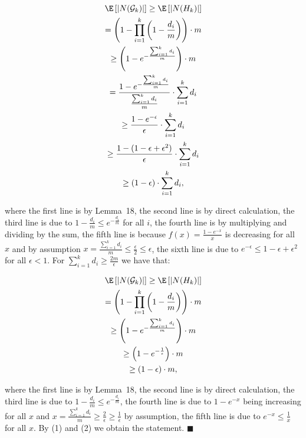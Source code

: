 \documentclass[10pt,a4paper]{article}
\begin{document}
\[\begin{gathered}
\displaystyle\E\left[|N(\mathcal{G}_{k})|\right] \displaystyle\geq\E\left[|N(H_{k})|\right] \\
\displaystyle=\left(1-\prod_{i=1}^{k}\left(1-\frac{d_{i}}{m}\right)\right)\cdot m \\
\displaystyle\geq\left(1-e^{-\frac{\sum_{i=1}^{k}d_{i}}{m}}\right)\cdot m \\
\displaystyle=\frac{1-e^{-\frac{\sum_{i=1}^{k}d_{i}}{m}}}{\frac{\sum_{i=1}^{k}d_{i}}{m}}\cdot\sum_{i=1}^{k}d_{i} \\
\displaystyle\geq\frac{1-e^{-\epsilon}}{\epsilon}\cdot\sum_{i=1}^{k}d_{i} \\
\displaystyle\geq\frac{1-(1-\epsilon+\epsilon^{2})}{\epsilon}\cdot\sum_{i=1}^{k}d_{i} \\
\displaystyle\geq\left(1-\epsilon\right)\cdot\sum_{i=1}^{k}d_{i},
\end{gathered}\]


where the first line is by Lemma 18, the second line is by direct calculation, the third line is due to $1-\frac{d_{i}}{m}\leq e^{-\frac{d_{i}}{m}}$ for all $i$, the fourth line is by multiplying and dividing by the sum, the fifth line is because $f(x)=\frac{1-e^{-x}}{x}$ is decreasing for all $x$ and by assumption $x=\frac{\sum_{i=1}^{k}d_{i}}{m}\leq\frac{\epsilon}{2}\leq\epsilon$, the sixth line is due to $e^{-\epsilon}\leq 1-\epsilon+\epsilon^{2}$ for all $\epsilon<1$.
For $\sum_{i=1}^{k}d_{i}\geq\frac{2m}{\epsilon}$ we have that:\par


\[\begin{gathered}
\displaystyle\E\left[|N(\mathcal{G}_{k})|\right] \displaystyle\geq\E\left[|N(H_{k})|\right] \\
\displaystyle=\left(1-\prod_{i=1}^{k}\left(1-\frac{d_{i}}{m}\right)\right)\cdot m \\
\displaystyle\geq\left(1-e^{-\frac{\sum_{i=1}^{k}d_{i}}{m}}\right)\cdot m \\
\displaystyle\geq\left(1-e^{-\frac{1}{\epsilon}}\right)\cdot m \\
\displaystyle\geq\left(1-\epsilon\right)\cdot m,
\end{gathered}\]


where the first line is by Lemma 18, the second line is by direct calculation, the third line is due to $1-\frac{d_{i}}{m}\leq e^{-\frac{d_{i}}{m}}$, the fourth line is due to $1-e^{-x}$ being increasing for all $x$ and $x=\frac{\sum_{i=1}^{k}d_{i}}{m}\geq\frac{2}{\epsilon}\geq\frac{1}{\epsilon}$ by assumption, the fifth line is due to $e^{-x}\leq\frac{1}{x}$ for all $x$.
By (1) and (2) we obtain the statement.
\ensuremath{\blacksquare}\par
\end{document}
